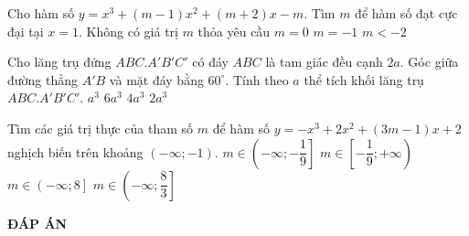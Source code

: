 \begin{ex}%
	Cho hàm số $y=x^3+(m-1)x^2+(m+2)x-m$. Tìm $m$ để hàm số đạt cực đại tại $x=1$.
	\choice
	{\True Không có giá trị $m$ thỏa yêu cầu}
	{$m=0$}
	{$m=-1$}
	{$m<-2$}
\end{ex}

\begin{ex}%
	Cho lăng trụ đứng $ABC.A'B'C'$ có đáy $ABC$ là tam giác đều cạnh $2a$. Góc giữa đường thẳng $A'B$ và mặt đáy bằng $60^{\circ}$. Tính theo $a$ thể tích khối lăng trụ $ABC.A'B'C'$.
	\choice
	{$a^3$}
	{\True $6a^3$}
	{$4a^3$}
	{$2a^3$}
\end{ex}

\begin{ex}%
	Tìm các giá trị thực của tham số $m$ để hàm số $y=-x^3+2x^2+(3m-1)x+2$ nghịch biến trên khoảng $(-\infty;-1)$.
	\choice
	{\True $m \in \left( -\infty;-\dfrac{1}{9} \right] $}
	{$m \in \left[ -\dfrac{1}{9};+\infty \right) $}
	{$m \in \left( -\infty;8 \right] $}
	{$m \in \left( -\infty;\dfrac{8}{3} \right] $}
\end{ex}

\newpage
\begin{center}
	\textbf{ĐÁP ÁN}
\end{center}
\begin{multicols}{10}
	 
\end{multicols}
